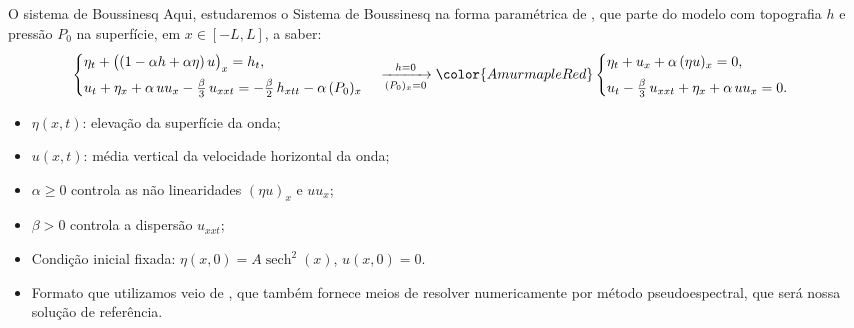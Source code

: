 \begin{frame}{O sistema de Boussinesq}
  Aqui, estudaremos o Sistema de Boussinesq na forma paramétrica de \textcite{martins2023},
  que parte do modelo com topografia $h$ e pressão $P_0$ na superfície, em $x \in [-L, L]$, a saber:
  \begin{equation*}
    \begin{cases}
      \eta_t + \bigl((1 - \alpha h + \alpha\eta)\,u\bigr)_x = h_t, \\[4pt]
      u_t + \eta_x + \alpha\,u u_x - \tfrac{\beta}{3}\,u_{xxt}
        = -\tfrac{\beta}{2}\,h_{xtt} - \alpha\,(P_0)_x
    \end{cases}
    \xrightarrow[(P_0)_x = 0]{h = 0}
    {\color{AmurmapleRed}
    \begin{cases}
      \eta_t + u_x + \alpha\,(\eta u)_x = 0, \\[4pt]
      u_t - \tfrac{\beta}{3}\,u_{xxt} + \eta_x + \alpha\,u u_x = 0 .
    \end{cases}}
  \end{equation*}
  \begin{itemize}[<+->]
    \item $\eta(x,t)$: elevação da superfície da onda;
    \item $u(x,t)$: média vertical da velocidade horizontal da onda;
    \item $\alpha \ge 0$ controla as não linearidades $(\eta u)_x$ e $u u_x$;
    \item $\beta > 0$ controla a dispersão $u_{xxt}$;
    \item Condição inicial fixada: $\eta(x,0) = A\operatorname{sech}^2(x)$,
          $u(x,0) = 0$.
    \item Formato que utilizamos veio de \textcite{martins2023}, que também fornece meios de resolver numericamente por método pseudoespectral, que será nossa solução de referência.
  \end{itemize}

\end{frame}

